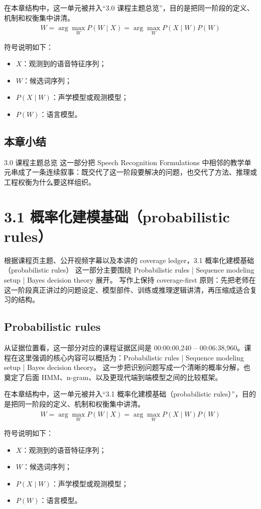 \documentclass[a4paper]{article}
\begin{document}
在本章结构中，这一单元被并入“3.0 课程主题总览”，目的是把同一阶段的定义、机制和权衡集中讲清。
\[
\hat{W} = \arg\max_W P(W \mid X) = \arg\max_W P(X \mid W) P(W)
\]

符号说明如下：
\begin{itemize}
\item $X$：观测到的语音特征序列；
\item $W$：候选词序列；
\item $P(X \mid W)$：声学模型或观测模型；
\item $P(W)$：语言模型。
\end{itemize}

\subsection{本章小结}
3.0 课程主题总览 这一部分把 Speech Recognition Formulations 中相邻的教学单元串成了一条连续叙事：既交代了这一阶段要解决的问题，也交代了方法、推理或工程权衡为什么要这样组织。

\section{3.1 概率化建模基础（probabilistic rules）}
根据课程页主题、公开视频字幕以及本讲的 coverage ledger，3.1 概率化建模基础（probabilistic rules） 这一部分主要围绕 Probabilistic rules | Sequence modeling setup | Bayes decision theory 展开。
写作上保持 coverage-first 原则：先把老师在这一阶段真正讲过的问题设定、模型部件、训练或推理逻辑讲清，再压缩成适合复习的结构。

\subsection{Probabilistic rules}
从证据位置看，这一部分对应的课程证据区间是 00:00:00,240 -- 00:06:38,960。课程在这里强调的核心内容可以概括为：Probabilistic rules | Sequence modeling setup | Bayes decision theory。
这一步把识别问题写成一个清晰的概率分解，也奠定了后面 HMM、n-gram、以及更现代端到端模型之间的比较框架。

在本章结构中，这一单元被并入“3.1 概率化建模基础（probabilistic rules）”，目的是把同一阶段的定义、机制和权衡集中讲清。
\[
\hat{W} = \arg\max_W P(W \mid X) = \arg\max_W P(X \mid W) P(W)
\]

符号说明如下：
\begin{itemize}
\item $X$：观测到的语音特征序列；
\item $W$：候选词序列；
\item $P(X \mid W)$：声学模型或观测模型；
\item $P(W)$：语言模型。
\end{itemize}
\end{document}
